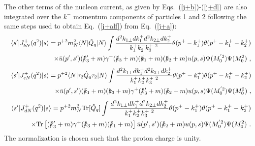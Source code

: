 \documentclass[preprint,aps,showpacs,floatfix]{revtex4}
\begin{document}
\begin{appendix}
The other terms of the nucleon current, as given by 
Eqs.~(\ref{j+b})-(\ref{j+d}) are also integrated over the $k^-$
momentum components of  particles 1 and 2 following the same steps
used to obtain Eq.~(\ref{j+alf}) from Eq.~(\ref{j+a}):
\begin{eqnarray}
&&\langle s'|J^+_{b N}(q^2)|s\rangle = p^{+2}m_N^2 \langle N|\hat Q_q|
N\rangle \int \frac{d^{2} k_{1\perp} dk^{+}_1d^{2} k_{2\perp} d
k^{+}_2 }{ k^+_1k^+_2k^{+\ 2}_3} \theta(p^+-k^+_1)
\theta(p^+-k^+_1-k^+_2) 
\nonumber \\
&&\times \bar u(p',s')(\rlap\slash k'_3+m)\gamma^+(\rlap\slash k_3+m)
 (\rlap\slash k_1+m)(\rlap\slash k_2+m)u(p,s)
\Psi (M^{'2}_0) \Psi (M^2_0) \ ,  \label{j+blf}
\end{eqnarray}
\begin{eqnarray}
&&\langle s'|J^+_{c N}(q^2)|s\rangle = p^{+2}\langle N|\tau_2\hat
Q_q \tau_2| N\rangle \int \frac{d^{2} k_{1\perp} dk^{+}_1d^{2}
k_{2\perp} d k^{+}_2 }{ k^+_1k^+_2k^{+\ 2}_3} \theta(p^+-k^+_1)
\theta(p^+-k^+_1-k^+_2) \nonumber \\
&&\times \bar u(p',s')(\rlap\slash k_1+m) (\rlap\slash k_3+m)\gamma^+
(\rlap\slash k'_3+m)(\rlap\slash k_2+m)u(p,s)
\Psi (M^{'2}_0) \Psi (M^2_0) \ ,  \label{j+clf}
\end{eqnarray}
\begin{eqnarray}
&&\langle s'|J^+_{d N}(q^2)|s\rangle = p^{+2}m_N^2{\mathrm{Tr}}[\hat
Q_q] \int \frac{d^{2} k_{1\perp} dk^{+}_1d^{2} k_{2\perp} d
k^{+}_2 }{ k^+_1k^+_2k^{+\ 2}_3} \theta(p^+-k^+_1)
\theta(p^+-k^+_1-k^+_2)
\nonumber \\
&&\times {\mathrm{Tr}}\left[ (\rlap\slash k'_3+m) \gamma^+ (\rlap\slash
k_3+m) (\rlap\slash k_1+m)\right]\bar u(p',s')(\rlap\slash k_2+m)u(p,s) \Psi (M^{'2}_0) \Psi
(M^2_0) \ .  \label{j+dlf}
\end{eqnarray}
The normalization is chosen such that the proton
charge is unity.
\end{appendix}
\end{document}
